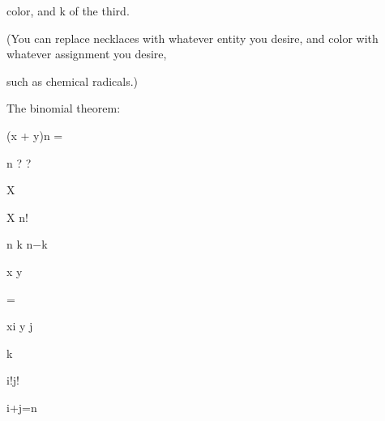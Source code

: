 \documentclass[a4paper,portrait,12pt]{article}
\begin{document}
\begin{flushleft}
color, and k of the third.
\end{flushleft}


\begin{flushleft}
(You can replace necklaces with whatever entity you desire, and color with whatever assignment you desire,
\end{flushleft}


\begin{flushleft}
such as chemical radicals.)
\end{flushleft}


\begin{flushleft}
The binomial theorem:
\end{flushleft}


\begin{flushleft}
(x + y)n =
\end{flushleft}





\begin{flushleft}
n ? ?
\end{flushleft}


\begin{flushleft}
X
\end{flushleft}


\begin{flushleft}
X n!
\end{flushleft}


\begin{flushleft}
n k n$-$k
\end{flushleft}


\begin{flushleft}
x y
\end{flushleft}


=


\begin{flushleft}
xi y j
\end{flushleft}


\begin{flushleft}
k
\end{flushleft}


\begin{flushleft}
i!j!
\end{flushleft}


\begin{flushleft}
i+j=n
\end{flushleft}
\end{document}
